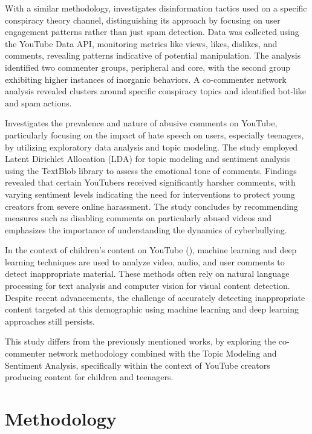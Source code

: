 \documentclass[12pt]{article}
\begin{document}
With a similar methodology, \cite{hussain2018analyzing} investigates 
disinformation tactics used on a specific conspiracy theory channel, distinguishing its approach by 
focusing on user engagement patterns rather than just spam detection. Data was collected using the 
YouTube Data API, monitoring metrics like views, likes, dislikes, and comments, revealing patterns 
indicative of potential manipulation. The analysis identified two commenter groups, peripheral and 
core, with the second group exhibiting higher instances of inorganic behaviors. A co-commenter network 
analysis revealed clusters around specific conspiracy topics and identified bot-like and spam actions. 

\cite{shekar2021} Investigates the prevalence and nature of abusive comments on YouTube, 
particularly focusing on the impact of hate speech on users, especially teenagers, by utilizing 
exploratory data analysis and topic modeling. 
The study employed Latent Dirichlet Allocation (LDA) for topic modeling and sentiment analysis using 
the TextBlob library to assess the emotional tone of comments. Findings revealed that certain 
YouTubers received significantly harsher comments, with varying sentiment levels indicating the 
need for interventions to protect young creators from severe online harassment. 
The study concludes by recommending measures such as disabling comments on particularly abused 
videos and emphasizes the importance of understanding the dynamics of cyberbullying.

In the context of children's content on YouTube (\cite{app13064044}), machine learning and deep learning 
techniques are used to analyze video, audio, and user comments to detect inappropriate 
material. These methods often rely on natural language processing for text analysis and computer 
vision for visual content detection. 
Despite recent advancements, the challenge of accurately detecting inappropriate content targeted at 
this demographic using machine learning and deep learning approaches still persists.


This study differs from the previously mentioned works, by exploring the co-commenter network
methodology combined with the Topic Modeling and Sentiment Analysis, 
specifically within the context of YouTube creators producing content for children and teenagers.


\section{Methodology}
\end{document}
